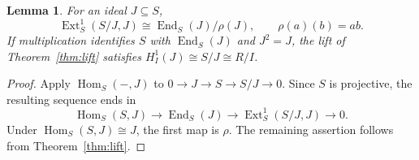 \documentclass[11pt,reqno]{amsart}
\newtheorem{lemma}[theorem]{Lemma}
\theoremstyle{definition}
\theoremstyle{remark}
\newcommand{\Hom}{\operatorname{Hom}}
\newcommand{\Ext}{\operatorname{Ext}}
\begin{document}
\begin{lemma}\label{lem:endomorphism}
For an ideal $J\subseteq S$,
\begin{equation}\label{eq:first}
\Ext_S^1(S/J,J)\cong\operatorname{End}_S(J)/\rho(J),
\qquad \rho(a)(b)=ab.
\end{equation}
If multiplication identifies $S$ with $\operatorname{End}_S(J)$ and $J^2=J$, the lift of Theorem~\ref{thm:lift} satisfies $H_I^1(J)\cong S/J\cong R/I$.
\end{lemma}
\begin{proof}
Apply $\Hom_S(-,J)$ to $0\to J\to S\to S/J\to0$. Since $S$ is projective, the resulting sequence ends in
\[
\Hom_S(S,J)\longrightarrow\operatorname{End}_S(J)
\longrightarrow\Ext_S^1(S/J,J)\longrightarrow0.
\]
Under $\Hom_S(S,J)\cong J$, the first map is $\rho$. The remaining assertion follows from Theorem~\ref{thm:lift}.
\end{proof}
\end{document}
